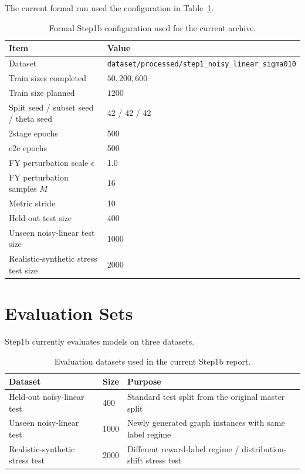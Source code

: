 The current formal run used the configuration in Table~\ref{tab:step1b-config}.

\begin{table}[h]
\centering
\caption{Formal Step1b configuration used for the current archive.}
\label{tab:step1b-config}
\begin{tabular}{ll}
\toprule
Item & Value \\
\midrule
Dataset & \texttt{dataset/processed/step1\_noisy\_linear\_sigma010} \\
Train sizes completed & \(50, 200, 600\) \\
Train size planned & \(1200\) \\
Split seed / subset seed / theta seed & 42 / 42 / 42 \\
2stage epochs & 500 \\
e2e epochs & 500 \\
FY perturbation scale \(\epsilon\) & 1.0 \\
FY perturbation samples \(M\) & 16 \\
Metric stride & 10 \\
Held-out test size & 400 \\
Unseen noisy-linear test size & 1000 \\
Realistic-synthetic stress test size & 2000 \\
\bottomrule
\end{tabular}
\end{table}

\section{Evaluation Sets}

Step1b currently evaluates models on three datasets.

\begin{table}[h]
\centering
\caption{Evaluation datasets used in the current Step1b report.}
\label{tab:evaluation-datasets}
\begin{tabular}{lll}
\toprule
Dataset & Size & Purpose \\
\midrule
Held-out noisy-linear test & 400 & Standard test split from the original master split \\
Unseen noisy-linear test & 1000 & Newly generated graph instances with same label regime \\
Realistic-synthetic stress test & 2000 & Different reward-label regime / distribution-shift stress test \\
\bottomrule
\end{tabular}
\end{table}

